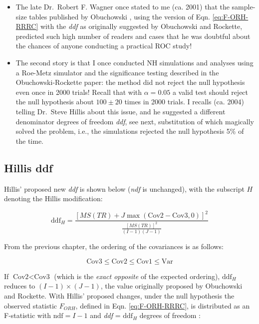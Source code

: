 \documentclass[
]{book}
\begin{document}
\begin{itemize}
\item
  The late Dr.~Robert F. Wagner once stated to me (ca. 2001) that the sample-size tables published by Obuchowski \citep{RN1971, RN1972}, using the version of Eqn. \eqref{eq:F-ORH-RRRC} with the \emph{ddf} as originally suggested by Obuchowski and Rockette, predicted such high number of readers and cases that he was doubtful about the chances of anyone conducting a practical ROC study!
\item
  The second story is that I once conducted NH simulations and analyses using a Roe-Metz simulator \citep{RN1125} and the significance testing described in the Obuchowski-Rockette paper: the method did not reject the null hypothesis even once in 2000 trials! Recall that with \(\alpha = 0.05\) a valid test should reject the null hypothesis about \(100\pm20\) times in 2000 trials. I recalls (ca. 2004) telling Dr.~Steve Hillis about this issue, and he suggested a different denominator degrees of freedom \emph{ddf}, see next, substitution of which magically solved the problem, i.e., the simulations rejected the null hypothesis 5\% of the time.
\end{itemize}

\hypertarget{Hills-ddf}{%
\subsection{Hillis ddf}\label{Hills-ddf}}

Hillis' proposed new \emph{ddf} is shown below (\emph{ndf} is unchanged), with the subscript \(H\) denoting the Hillis modification:

\begin{equation}
\text{ddf}_H = \frac{\left [ MS(TR) + J \max(\text{Cov2}-\text{Cov3},0)\right ]^2}{\frac{\left [ MS(TR) \right ]^2}{(I-1)(J-1)}}
\label{eq:ddfH-RRRC}
\end{equation}

From the previous chapter, the ordering of the covariances is as follows:

\begin{equation*}
\text{Cov3} \leq  \text{Cov2} \leq  \text{Cov1} \leq  \text{Var}
\end{equation*}

If \(\text{Cov2} < \text{Cov3}\) (which is the \emph{exact opposite} of the expected ordering), \(\text{ddf}_H\) reduces to \((I-1)\times(J-1)\), the value originally proposed by Obuchowski and Rockette. With Hillis' proposed changes, under the null hypothesis the observed statistic \(F_{ORH}\), defined in Eqn. \eqref{eq:F-ORH-RRRC}, is distributed as an F-statistic with \(\text{ndf} = I-1\) and \emph{ddf} = \(\text{ddf}_H\) degrees of freedom \citep{RN1772, RN1865, RN1866}:
\end{document}

